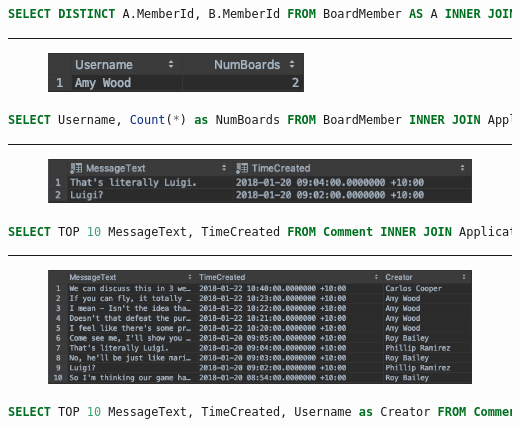 \documentclass[letterpaper]{article}
\begin{document}
\begin{lstlisting}[language=SQL, caption=Find Users Who Share At Least One Board]
SELECT DISTINCT A.MemberId, B.MemberId FROM BoardMember AS A INNER JOIN BoardMember as B ON A.BoardId = B.BoardId AND B.MemberId > A.MemberId;
\end{lstlisting}
\hrule
\begin{figure}[H]
\centering
\includegraphics[scale=0.5]{Images/BoardsForUser}
\end{figure}
\begin{lstlisting}[language=SQL, caption=Select Board Membership for User "Amy Wood"]
SELECT Username, Count(*) as NumBoards FROM BoardMember INNER JOIN ApplicationUser on BoardMember.MemberId = ApplicationUser.Id WHERE Username = 'Amy Wood' GROUP BY Username;
\end{lstlisting}
\hrule
\begin{figure}[H]
\centering
\includegraphics[scale=0.5]{Images/CommentsForUser}
\end{figure}
\begin{lstlisting}[language=SQL, caption=Select 10 Most Recent Comments for User "Phillip Ramirez"]
SELECT TOP 10 MessageText, TimeCreated FROM Comment INNER JOIN ApplicationUser on ApplicationUser.Id = Comment.OwnerId WHERE Username = 'Phillip Ramirez' ORDER BY TimeCreated DESC;
\end{lstlisting}
\hrule
\begin{figure}[H]
\centering
\includegraphics[scale=0.5]{Images/CommentsAllUsers}
\end{figure}
\begin{lstlisting}[language=SQL, caption=Select 10 Most Recent Comments]
SELECT TOP 10 MessageText, TimeCreated, Username as Creator FROM Comment, ApplicationUser WHERE ApplicationUser.Id = Comment.OwnerId ORDER BY TimeCreated DESC;
\end{lstlisting}
\end{document}

